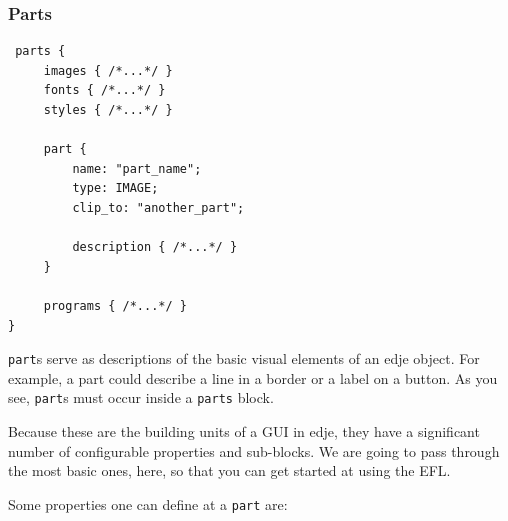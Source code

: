 \documentclass[a4paper]{profusion}
\begin{document}
\subsubsection{Parts}


\begin{lstlisting}
 parts {
     images { /*...*/ }
     fonts { /*...*/ }
     styles { /*...*/ }

     part {
         name: "part_name";
         type: IMAGE;
         clip_to: "another_part";

         description { /*...*/ }
     }

     programs { /*...*/ }
}
\end{lstlisting}

\texttt{part}s serve as descriptions of the basic visual elements of
an edje object. For example, a part could describe a line in a border
or a label on a button. As you see, \texttt{part}s must occur inside a
\texttt{parts} block.

Because these are the building units of a GUI in edje, they have a
significant number of configurable properties and sub-blocks. We are
going to pass through the most basic ones, here, so that you can get
started at using the EFL.

Some properties one can define at a \texttt{part} are:
\end{document}
